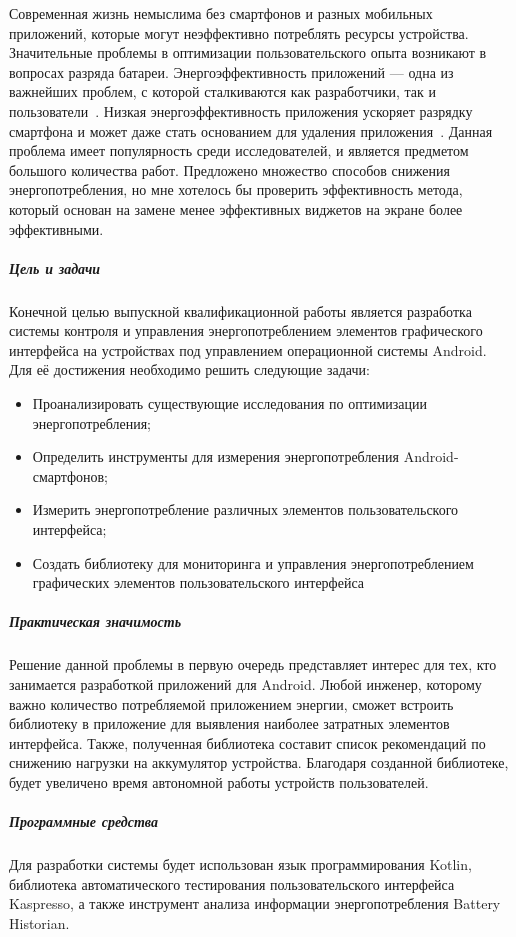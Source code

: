 

Современная жизнь немыслима без смартфонов и разных мобильных приложений, которые могут неэффективно потреблять ресурсы устройства. Значительные проблемы в оптимизации пользовательского опыта возникают в вопросах разряда батареи. Энергоэффективность приложений --- одна из важнейших проблем, с которой сталкиваются как разработчики, так и пользователи~\parencite{man2016experience, wasserman2010software}. Низкая энергоэффективность приложения ускоряет разрядку смартфона и может даже стать основанием для удаления приложения~\parencite{ickin2017users}. Данная проблема имеет популярность среди исследователей, и является предметом большого количества работ. Предложено множество способов снижения энергопотребления, но мне хотелось бы проверить эффективность метода, который основан на замене менее эффективных виджетов на экране более эффективными.

\subparagraph{Цель и задачи}
Конечной целью выпускной квалификационной работы является разработка системы контроля и управления энергопотреблением элементов графического интерфейса на устройствах под управлением операционной системы Android. Для её достижения необходимо решить следующие задачи:
\begin{itemize}
	\item Проанализировать существующие исследования по оптимизации энергопотребления;
	\item Определить инструменты для измерения энергопотребления Android-смартфонов;
	\item Измерить энергопотребление различных элементов пользовательского интерфейса;
	\item Создать библиотеку для мониторинга и управления энергопотреблением графических элементов пользовательского интерфейса
\end{itemize}

\subparagraph{Практическая значимость}
Решение данной проблемы в первую очередь представляет интерес для тех, кто занимается разработкой приложений для Android. Любой инженер, которому важно количество потребляемой приложением энергии, сможет встроить библиотеку в приложение для выявления наиболее затратных элементов интерфейса. Также, полученная библиотека составит список рекомендаций по снижению нагрузки на аккумулятор устройства. Благодаря созданной библиотеке, будет увеличено время автономной работы устройств пользователей.

\subparagraph{Программные средства}
Для разработки системы будет использован язык программирования Kotlin, библиотека автоматического тестирования пользовательского интерфейса Kaspresso, а также инструмент анализа информации энергопотребления Battery Historian.